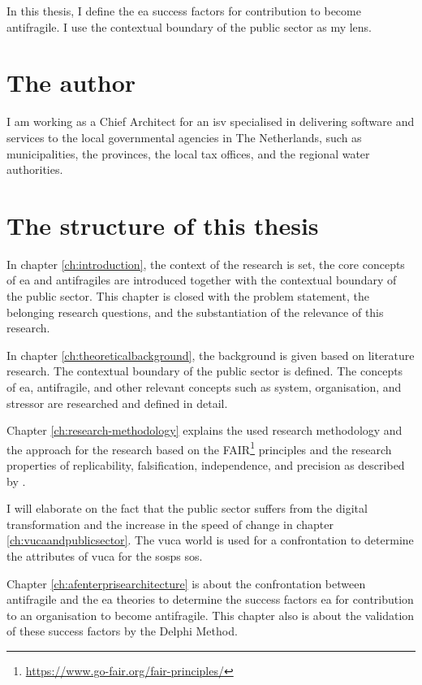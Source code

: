 In this thesis, I define the \acrfull{ea} success factors for contribution to become \gls{antifragile}. I use the contextual boundary of the public sector as my lens.

\section{The author}
\label{sec:context}
I am working as a Chief Architect for an \acrfull{isv} specialised in delivering software and services to the local governmental agencies in The Netherlands, such as municipalities, the provinces, the local tax offices, and the regional water authorities. 

\section{The structure of this thesis}
\label{sec:structure}
In chapter \ref{ch:introduction}, the context of the research is set, the core concepts of \acrshort{ea} and \glspl{antifragile} are introduced together with the contextual boundary of the public sector. This chapter is closed with the problem statement, the belonging research questions, and the substantiation of the relevance of this research.

In chapter \ref{ch:theoreticalbackground}, the background is given based on literature research. The contextual boundary of the public sector is defined. The concepts of \acrshort{ea}, \gls{antifragile}, and other relevant concepts such as system, organisation, and stressor are researched and defined in detail. 

Chapter \ref{ch:research-methodology} explains the used research methodology and the approach for the research based on the FAIR\footnote{\url{https://www.go-fair.org/fair-principles/}} principles and the research properties of replicability, falsification, independence, and precision as described by \textcite{Recker2013}.

I will elaborate on the fact that the public sector suffers from the digital transformation and the increase in the speed of change in chapter \ref{ch:vucaandpublicsector}. The \acrfull{vuca} world \parencite{Bennett2014} is used for a confrontation to determine the attributes of \acrshort{vuca} for the \acrfull{sosps} \acrfull{sos}. 

Chapter \ref{ch:afenterprisearchitecture} is about the confrontation between \gls{antifragile} and the \acrfull{ea} theories to determine the success factors \acrshort{ea} for contribution to an organisation to become \gls{antifragile}. This chapter also is about the validation of these success factors by the Delphi Method.

